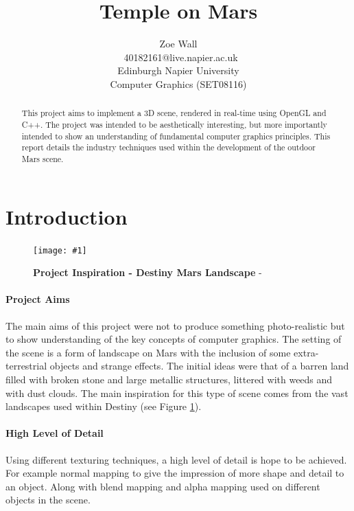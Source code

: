 \documentclass[conference]{acmsiggraph}
\title{Temple on Mars}
\author{Zoe Wall \\\ 40182161@live.napier.ac.uk \\
Edinburgh Napier University \\
Computer Graphics (SET08116)}
\newcommand{\figuremacroW}[4]{
	\begin{figure}[h] %
		\centering
		\texttt{[image: \#1]}
		\caption[#2]{\textbf{#2} - #3}
		\label{fig:#1}
	\end{figure}
}
\begin{document}

\maketitle

\begin{abstract}
This project aims to implement a 3D scene, rendered in real-time using OpenGL and C++. The project was intended to be aesthetically interesting, but more importantly intended to show an understanding of fundamental computer graphics principles. This report details the industry techniques used within the development of the outdoor Mars scene.
\end{abstract}

\keywordlist

\section{Introduction}

\figuremacroW
{DestinyMars1}
{Project Inspiration - Destiny Mars Landscape}
{\protect\cite{Destiny}}
{1.0}

\paragraph{Project Aims}The main aims of this project were not to produce something photo-realistic but to show understanding of the key concepts of computer graphics. The setting of the scene is a form of landscape on Mars with the inclusion of some extra-terrestrial objects and strange effects. The initial ideas were that of a barren land filled with broken stone and large metallic structures, littered with weeds and with dust clouds. The main inspiration for this type of scene comes from the vast landscapes used within Destiny (see Figure \ref{fig:DestinyMars1}).

\paragraph{High Level of Detail} Using different texturing techniques, a high level of detail is hope to be achieved. For example normal mapping to give the impression of more shape and detail to an object. Along with blend mapping and alpha mapping used on different objects in the scene.
\end{document}
